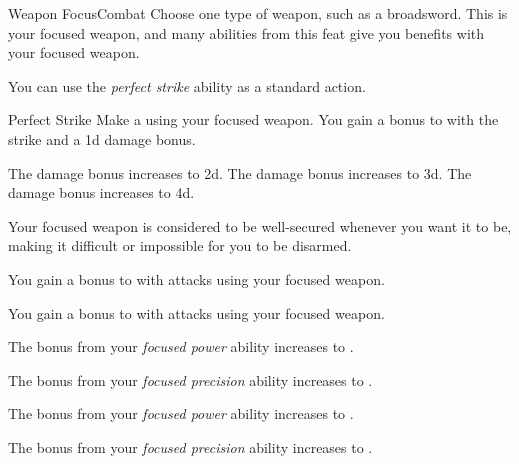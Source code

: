     \begin{feat}{Weapon Focus}{Combat}
         Choose one type of weapon, such as a broadsword.
        This is your focused weapon, and many abilities from this feat give you benefits with your focused weapon.

         You can use the \textit{perfect strike} ability as a standard action.
        \begin{freeability}{Perfect Strike}
            Make a  using your focused weapon.
            You gain a  bonus to  with the strike and a \plus1d damage bonus.

            \rankline
             The damage bonus increases to \plus2d.
             The damage bonus increases to \plus3d.
             The damage bonus increases to \plus4d.
        \end{freeability}

         Your focused weapon is considered to be well-secured whenever you want it to be, making it difficult or impossible for you to be disarmed.

         You gain a  bonus to  with attacks using your focused weapon.

         You gain a  bonus to  with attacks using your focused weapon.

         The bonus from your \textit{focused power} ability increases to .

         The bonus from your \textit{focused precision} ability increases to .

         The bonus from your \textit{focused power} ability increases to .

         The bonus from your \textit{focused precision} ability increases to .
    \end{feat}


